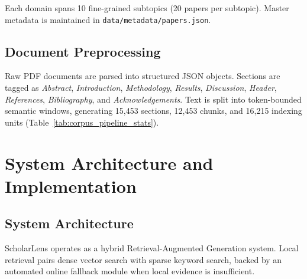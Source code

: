 \documentclass[conference]{IEEEtran}
\begin{document}
Each domain spans 10 fine-grained subtopics (20 papers per subtopic). Master metadata is maintained in \texttt{data/metadata/papers.json}.

\subsection{Document Preprocessing}

Raw PDF documents are parsed into structured JSON objects. Sections are tagged as \textit{Abstract}, \textit{Introduction}, \textit{Methodology}, \textit{Results}, \textit{Discussion}, \textit{Header}, \textit{References}, \textit{Bibliography}, and \textit{Acknowledgements}. Text is split into token-bounded semantic windows, generating 15,453 sections, 12,453 chunks, and 16,215 indexing units (Table~\ref{tab:corpus_pipeline_stats}).

\begin{table}[htbp]
\caption{ScholarLens Corpus Preprocessing Statistics}
\label{tab:corpus_pipeline_stats}
\centering
{}
\end{table}

\section{System Architecture and Implementation}

\subsection{System Architecture}

ScholarLens operates as a hybrid Retrieval-Augmented Generation system. Local retrieval pairs dense vector search with sparse keyword search, backed by an automated online fallback module when local evidence is insufficient.
\end{document}
